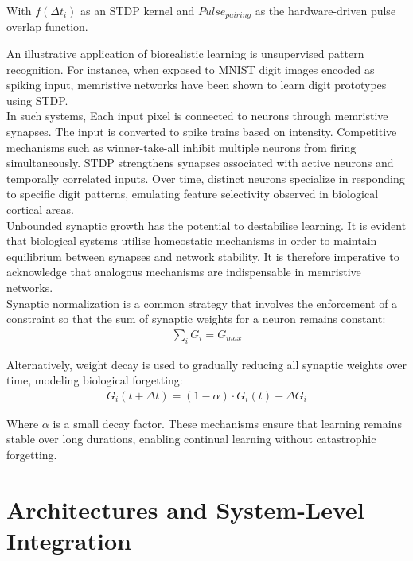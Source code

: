 \noindent With $f(\Delta t_i)$ as an STDP kernel and $Pulse_{pairing}$ as the hardware-driven pulse overlap function.

\noindent An illustrative application of biorealistic learning is unsupervised pattern recognition. For instance, when exposed to MNIST digit images encoded as spiking input, memristive networks have been shown to learn digit prototypes using STDP.\\

\noindent In such systems, Each input pixel is connected to neurons through memristive synapses. The input is converted to spike trains based on intensity. Competitive mechanisms such as winner-take-all inhibit multiple neurons from firing simultaneously. STDP strengthens synapses associated with active neurons and temporally correlated inputs. Over time, distinct neurons specialize in responding to specific digit patterns, emulating feature selectivity observed in biological cortical areas.\\

\noindent Unbounded synaptic growth has the potential to destabilise learning. It is evident that biological systems utilise homeostatic mechanisms in order to maintain equilibrium between synapses and network stability. It is therefore imperative to acknowledge that analogous mechanisms are indispensable in memristive networks. \\

\noindent Synaptic normalization is a common strategy that involves the enforcement of a constraint so that the sum of synaptic weights for a neuron remains constant:
\begin{align}
    \sum_{i} G_i = G_{max} \label{eq:1.38}
\end{align}

\noindent Alternatively, weight decay is used to gradually reducing all synaptic weights over time, modeling biological forgetting:
\begin{align}
    G_i(t + \Delta t) = (1 - \alpha) \cdot G_i(t) + \Delta G_i \label{eq:1.39}
\end{align}

\noindent Where $\alpha$ is a small decay factor. These mechanisms ensure that learning remains stable over long durations, enabling continual learning without catastrophic forgetting.

\section[Architectures and System-Level Integration]{Architectures and System-Level Integration}

